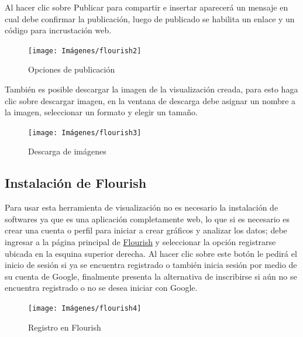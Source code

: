 \documentclass[
]{book}
\begin{document}
Al hacer clic sobre Publicar para compartir e insertar aparecerá un mensaje en cual debe confirmar la publicación, luego de publicado se habilita un enlace y un código para incrustación web.

\begin{figure}

{\centering \texttt{[image: Imágenes/flourish2]} 

}

\caption{Opciones de publicación}\label{fig:compartirtrabajoflourishpublicar-fig}
\end{figure}

También es posible descargar la imagen de la visualización creada, para esto haga clic sobre descargar imagen, en la ventana de descarga debe asignar un nombre a la imagen, seleccionar un formato y elegir un tamaño.

\begin{figure}

{\centering \texttt{[image: Imágenes/flourish3]} 

}

\caption{Descarga de imágenes}\label{fig:compartirtrabajoflourishdescargarimagen-fig}
\end{figure}

\hypertarget{instalaciuxf3n-de-flourish}{%
\subsection{Instalación de Flourish}\label{instalaciuxf3n-de-flourish}}

Para usar esta herramienta de visualización no es necesario la instalación de softwares ya que es una aplicación completamente web, lo que si es necesario es crear una cuenta o perfil para iniciar a crear gráficos y analizar los datos; debe ingresar a la página principal de \href{https://flourish.studio/}{Flourish} y seleccionar la opción registrarse ubicada en la esquina superior derecha. Al hacer clic sobre este botón le pedirá el inicio de sesión si ya se encuentra registrado o también inicia sesión por medio de su cuenta de Google, finalmente presenta la alternativa de inscribirse si aún no se encuentra registrado o no se desea iniciar con Google.

\begin{figure}

{\centering \texttt{[image: Imágenes/flourish4]} 

}

\caption{Registro en Flourish}\label{fig:crearcuentaflourish-fig}
\end{figure}
\end{document}
